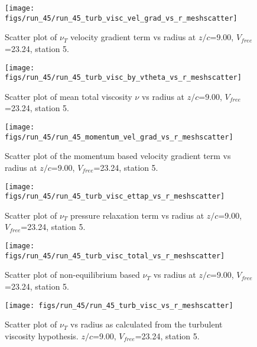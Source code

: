 \begin{figure}[H]
\centering
\texttt{[image: figs/run\_45/run\_45\_turb\_visc\_vel\_grad\_vs\_r\_meshscatter]}
\caption{Scatter plot of $\nu_T$ velocity gradient term vs radius at $z/c$=9.00, $V_{free}$=23.24, station 5.}
\end{figure}


\begin{figure}[H]
\centering
\texttt{[image: figs/run\_45/run\_45\_turb\_visc\_by\_vtheta\_vs\_r\_meshscatter]}
\caption{Scatter plot of mean total viscosity $\nu$ vs radius at $z/c$=9.00, $V_{free}$=23.24, station 5.}
\end{figure}


\begin{figure}[H]
\centering
\texttt{[image: figs/run\_45/run\_45\_momentum\_vel\_grad\_vs\_r\_meshscatter]}
\caption{Scatter plot of the momentum based velocity gradient term vs radius at $z/c$=9.00, $V_{free}$=23.24, station 5.}
\end{figure}


\begin{figure}[H]
\centering
\texttt{[image: figs/run\_45/run\_45\_turb\_visc\_ettap\_vs\_r\_meshscatter]}
\caption{Scatter plot of $\nu_T$ pressure relaxation term vs radius at $z/c$=9.00, $V_{free}$=23.24, station 5.}
\end{figure}


\begin{figure}[H]
\centering
\texttt{[image: figs/run\_45/run\_45\_turb\_visc\_total\_vs\_r\_meshscatter]}
\caption{Scatter plot of non-equilibrium based $\nu_T$ vs radius at $z/c$=9.00, $V_{free}$=23.24, station 5.}
\end{figure}


\begin{figure}[H]
\centering
\texttt{[image: figs/run\_45/run\_45\_turb\_visc\_vs\_r\_meshscatter]}
\caption{Scatter plot of $\nu_T$ vs radius as calculated from the turbulent viscosity hypothesis. $z/c$=9.00, $V_{free}$=23.24, station 5.}
\end{figure}


